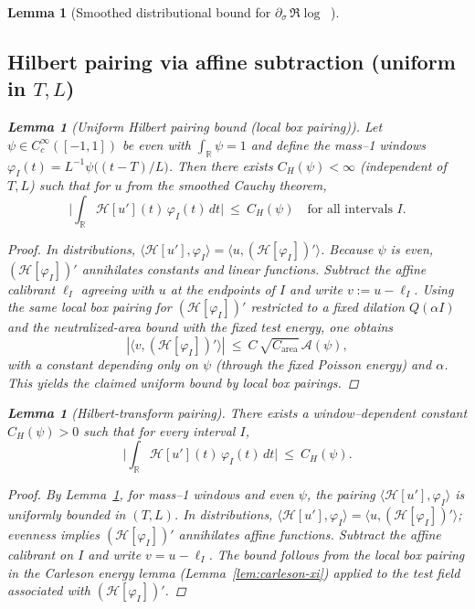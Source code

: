 \documentclass[11pt]{article}
\newtheorem{lemma}[theorem]{Lemma}
\theoremstyle{definition}
\theoremstyle{remark}
\newcommand{\R}{\mathbb{R}}
\DeclareMathOperator{\dettwo}{det_2}
\begin{document}
\begin{lemma}[Smoothed distributional bound for $\partial_\sigma\,\Re\log\dettwo$]
\subsection*{Hilbert pairing via affine subtraction (uniform in $T,L$)}
\begin{lemma}[Uniform Hilbert pairing bound (local box pairing)]\label{lem:hilbert-H1BMO}
Let $\psi\in C_c^\infty([-1,1])$ be even with $\int_\R\psi=1$ and define the mass--1 windows $\varphi_I(t)=L^{-1}\psi\big((t-T)/L\big)$. Then there exists $C_H(\psi)<\infty$ (independent of $T,L$) such that for $u$ from the smoothed Cauchy theorem,
\[
  \Big|\int_\R \mathcal H[u'](t)\,\varphi_I(t)\,dt\Big|\ \le\ C_H(\psi)\quad\text{for all intervals }I.
\]
\end{lemma}
\begin{proof}
In distributions, $\langle \mathcal H[u'],\varphi_I\rangle=\langle u,(\mathcal H[\varphi_I])'\rangle$. Because $\psi$ is even, $(\mathcal H[\varphi_I])'$ annihilates constants and linear functions. Subtract the affine calibrant $\ell_I$ agreeing with $u$ at the endpoints of $I$ and write $v:=u-\ell_I$. Using the same local box pairing for $(\mathcal H[\varphi_I])'$ restricted to a fixed dilation $Q(\alpha I)$ and the neutralized-area bound with the fixed test energy, one obtains
\[
  |\langle v,(\mathcal H[\varphi_I])'\rangle|\ \le\ C\,\sqrt{C_{\mathrm{area}}}\,\mathcal A(\psi),
\]
with a constant depending only on $\psi$ (through the fixed Poisson energy) and $\alpha$. This yields the claimed uniform bound by local box pairings.
\end{proof}
\begin{lemma}[Hilbert-transform pairing]\label{lem:hilbert}
There exists a window–dependent constant \(C_H(\psi)>0\) such that for every interval \(I\),
\[ \Big|\int_{\R} \mathcal H[u'](t)\,\varphi_I(t)\,dt\Big|\ \le\ C_H(\psi).\]
\end{lemma}
\begin{proof}
By Lemma~\ref{lem:hilbert-H1BMO}, for mass–1 windows and even \(\psi\), the pairing \(\langle \mathcal H[u'],\varphi_I\rangle\) is uniformly bounded in \((T,L)\). In distributions, \(\langle \mathcal H[u'],\varphi_I\rangle=\langle u,(\mathcal H[\varphi_I])'\rangle\); evenness implies \((\mathcal H[\varphi_I])'\) annihilates affine functions. Subtract the affine calibrant on \(I\) and write \(v=u-\ell_I\). The bound follows from the local box pairing in the Carleson energy lemma (Lemma~\ref{lem:carleson-xi}) applied to the test field associated with \((\mathcal H[\varphi_I])'\).
\end{proof}


\end{lemma}
\end{document}
